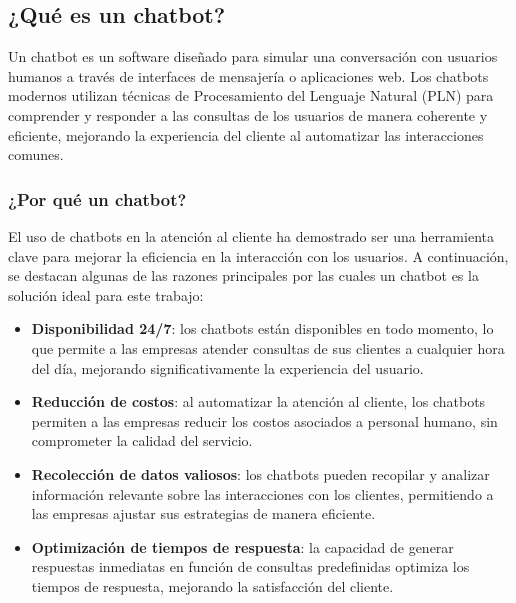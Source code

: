 \subsection{¿Qué es un chatbot?}

Un chatbot es un software diseñado para simular una conversación con usuarios humanos a través de interfaces de mensajería o aplicaciones web. Los chatbots modernos utilizan técnicas de Procesamiento del Lenguaje Natural (PLN) para comprender y responder a las consultas de los usuarios de manera coherente y eficiente, mejorando la experiencia del cliente al automatizar las interacciones comunes.

\subsubsection{¿Por qué un chatbot?}

El uso de chatbots en la atención al cliente ha demostrado ser una herramienta clave para mejorar la eficiencia en la interacción con los usuarios. A continuación, se destacan algunas de las razones principales por las cuales un chatbot es la solución ideal para este trabajo:

\begin{itemize}
    \item \textbf{Disponibilidad 24/7}: los chatbots están disponibles en todo momento, lo que permite a las empresas atender consultas de sus clientes a cualquier hora del día, mejorando significativamente la experiencia del usuario.
    
    \item \textbf{Reducción de costos}: al automatizar la atención al cliente, los chatbots permiten a las empresas reducir los costos asociados a personal humano, sin comprometer la calidad del servicio.
    
    \item \textbf{Recolección de datos valiosos}: los chatbots pueden recopilar y analizar información relevante sobre las interacciones con los clientes, permitiendo a las empresas ajustar sus estrategias de manera eficiente.
    
    \item \textbf{Optimización de tiempos de respuesta}: la capacidad de generar respuestas inmediatas en función de consultas predefinidas optimiza los tiempos de respuesta, mejorando la satisfacción del cliente.
\end{itemize}


